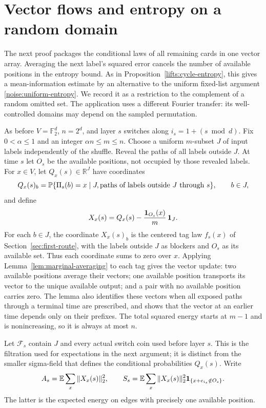 \section{Vector flows and entropy on a random domain}
\label{sec:c-random-domains}

The next proof packages the conditional laws of all remaining cards
in one vector array. Averaging the next label's squared error cancels
the number of available positions in the entropy bound. As in
Proposition~\ref{lifts:cycle-entropy}, this gives a mean-information
estimate by an alternative to the uniform fixed-list argument
\eqref{noise:uniform-entropy}. We record it as a restriction to the
complement of a random omitted set. The application uses a different
Fourier transfer: its well-controlled domains may depend on the
sampled permutation.

As before $V=\mathbb F_2^d$, $n=2^d$, and layer $s$ switches along
$i_s=1+(s\bmod d)$.  Fix $0<\alpha\le1$ and an integer
$\alpha n\le m\le n$.  Choose a uniform $m$-subset $J$ of input
labels independently of the shuffle.  Reveal the paths of all labels
outside $J$.  At time $s$ let $O_s$ be the available positions, not
occupied by those revealed labels.  For $x\in V$, let $Q_x(s)\in\mathbb R^J$
have coordinates
\[
 Q_x(s)_b=\mathbb P\{\Pi_s(b)=x\mid J,
                  \hbox{paths of labels outside }J\hbox{ through }s\},
 \qquad b\in J,
\]
and define
\[
 X_x(s)=Q_x(s)-\frac{{\bf1}_{O_s}(x)}m\,\mathbf1_J.
\]
For each $b\in J$, the coordinate $X_x(s)_b$ is the centered tag law
$f_s(x)$ of Section~\ref{sec:first-route}, with the labels outside $J$
as blockers and $O_s$ as its available set.  Thus each coordinate sums
to zero over $x$.  Applying Lemma~\ref{lem:marginal-averaging} to each
tag gives the vector update: two available positions average their
vectors; one available position transports its vector to the unique
available output; and a pair with no available position carries zero.
The lemma also identifies these vectors when all exposed paths through
a terminal time are prescribed, and shows that the vector at an earlier
time depends only on their prefixes.  The total squared energy starts
at $m-1$ and is nonincreasing, so it is always at most $n$.

Let $\mathcal F_s$ contain $J$ and every actual switch coin used before
layer $s$.  This is the filtration used for expectations in the next
argument; it is distinct from the smaller sigma-field that defines the
conditional probabilities $Q_x(s)$.  Write
\[
 A_s=\mathbb E\sum_x\|X_x(s)\|_2^2,
 \qquad
 S_s=\mathbb E\sum_x\|X_x(s)\|_2^2
                  {\bf1}_{\{x+e_{i_s}\notin O_s\}}.
\]
The latter is the expected energy on edges with precisely one available
position.

